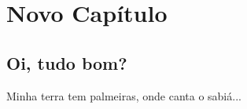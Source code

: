 %
%
%
%
\chapter{Novo Capítulo}

\section{Oi, tudo bom?}

Minha terra tem palmeiras, onde canta o sabiá...

